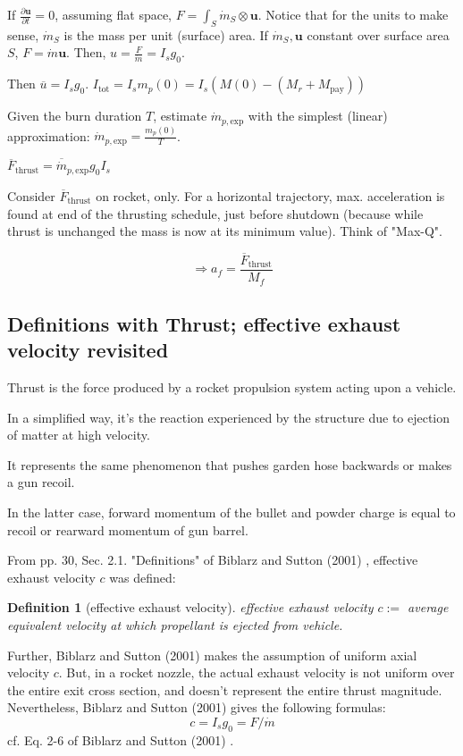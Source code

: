 \documentclass[10pt]{amsart}
\newtheorem{definition}{Definition}
\begin{document}
\begin{multicols*}{2}
If $\frac{\partial \mathbf{u}}{ \partial t} = 0$, assuming flat space, $F = \int_S \dot{m}_S \otimes \mathbf{u}$. Notice that for the units to make sense, $\dot{m}_S$ is the mass per unit (surface) area. If $\dot{m}_S , \mathbf{u}$ constant over surface area $S$, $F= \dot{m} \mathbf{u}$.  Then, $u = \frac{F}{\dot{m}} = I_s g_0$.

Then $\overline{u} = I_s g_0$.  
$I_{\text{tot}} = I_s m_p(0) = I_s(M(0) - (M_r + M_{\text{pay}}))$

Given the burn duration $T$, estimate $\dot{m}_{p, \text{exp}}$ with the simplest (linear) approximation:
$\dot{m}_{p, \text{exp}} = \frac{m_p(0)}{T}$.

$\overline{F}_{\text{thrust}} = \overline{ \dot{m}}_{p, \text{exp}} g_0 I_s$

Consider $\overline{F}_{\text{thrust}}$ on rocket, only. For a horizontal trajectory, max. acceleration is found at end of the thrusting schedule, just before shutdown (because while thrust is unchanged the mass is now at its minimum value). Think of "Max-Q".

\[
\Longrightarrow a_f = \frac{ \overline{F}_{\text{thrust}} }{ M_f}
\]
 
\subsection{Definitions with Thrust; effective exhaust velocity revisited}

Thrust is the force produced by a rocket propulsion system acting upon a vehicle.

In a simplified way, it's the reaction experienced by the structure due to ejection of matter at high velocity.

It represents the same phenomenon that pushes garden hose backwards or makes a gun recoil.  

In the latter case, forward momentum of the bullet and powder charge is equal to recoil or rearward momentum of gun barrel.

From pp. 30, Sec. 2.1. "Definitions" of Biblarz and Sutton (2001) \cite{GSuttonOBiblarz2001}, effective exhaust velocity $c$ was defined:
\begin{definition}[effective exhaust velocity]
effective exhaust velocity $c :=$ average equivalent velocity at which propellant is ejected from vehicle.
\end{definition}
Further, Biblarz and Sutton (2001) makes the assumption of uniform axial velocity $c$. But, in a rocket nozzle, the actual exhaust velocity is not uniform over the entire exit cross section, and doesn't represent the entire thrust magnitude. Nevertheless, Biblarz and Sutton (2001) gives the following formulas:
\[
c = I_s g_0 = F/\dot{m} 
\]
cf. Eq. 2-6 of Biblarz and Sutton (2001) \cite{GSuttonOBiblarz2001}.


\end{multicols*}
\end{document}
